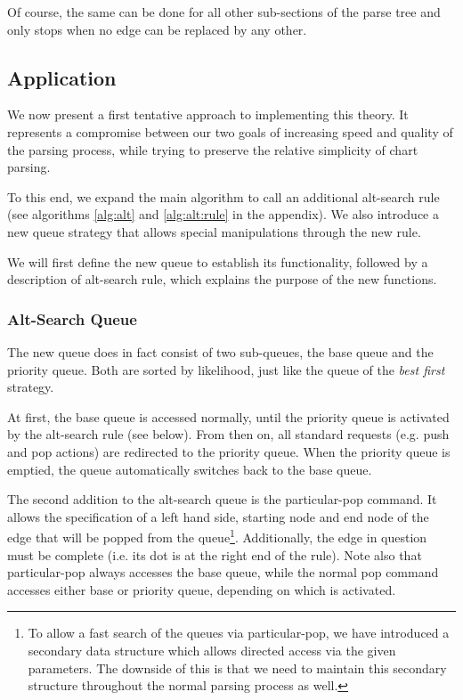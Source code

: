\documentclass[11pt, titlepage, a4paper]{scrartcl}		%
\newcommand{\xmas}[1]{alt-search#1}
\newcommand{\XMas}[1]{Alt-Search#1}
\begin{document}
Of course, the same can be done for all other sub-sections of the parse tree and only stops when no edge can be replaced by any other.

\subsection{Application}
\label{sec:alt:app}
We now present a first tentative approach to implementing this theory.
It represents a compromise between our two goals of increasing speed and quality of the parsing process, while trying to preserve the relative simplicity of chart parsing.

To this end, we expand the main algorithm to call an additional \xmas{} rule (see algorithms \ref{alg:alt} and \ref{alg:alt:rule} in the appendix).
We also introduce a new queue strategy that allows special manipulations through the new rule.

We will first define the new queue to establish its functionality, followed by a description of \xmas{} rule, which explains the purpose of the new functions.

\subsubsection{\XMas{} Queue}
The new queue does in fact consist of two sub-queues, the base queue and the priority queue. 
Both are sorted by likelihood, just like the queue of the \textit{best first} strategy.

At first, the base queue is accessed normally, until the priority queue is activated by the \xmas{} rule (see below). From then on, all standard requests (e.g. push and pop actions) are redirected to the priority queue. When the priority queue is emptied, the queue automatically switches back to the base queue.

The second addition to the \xmas{} queue is the particular-pop command. It allows the specification of a left hand side, starting node and end node of the edge that will be popped from the queue\footnote{To allow a fast search of the queues via particular-pop, we have introduced a secondary data structure which allows directed access via the given parameters. The downside of this is that we need to maintain this secondary structure throughout the normal parsing process as well.}.
Additionally, the edge in question must be complete (i.e. its dot is at the right end of the rule).
Note also that particular-pop always accesses the base queue, while the normal pop command accesses either base or priority queue, depending on which is activated.
\end{document}
